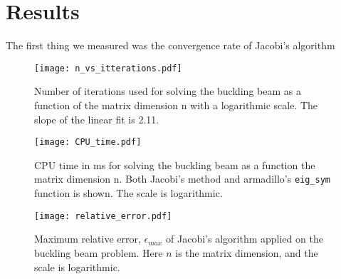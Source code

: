 \section{Results}
\label{sec:results}

The first thing we measured was the convergence rate of Jacobi's algorithm
\begin{figure}[htbp]
	\centering
	\texttt{[image: n\_vs\_itterations.pdf]}
	\caption{Number of iterations used for solving the buckling beam as a function of the matrix dimension n with a logarithmic scale. The slope of the linear fit is 2.11.}
	\label{fig:n_vs_it}
\end{figure}


\begin{figure}[htbp]
	\centering
	\texttt{[image: CPU\_time.pdf]}
	\caption{CPU time in ms for solving the buckling beam as a function the matrix dimension n. Both Jacobi's method and armadillo's \texttt{eig\_sym} function is shown. The scale is logarithmic.}
	\label{fig:CPUtime}
\end{figure}

\begin{figure}[htbp]
	\centering
	\texttt{[image: relative\_error.pdf]}
	\caption{Maximum relative error, $\epsilon_{max}$ of Jacobi's algorithm applied on the buckling beam problem.
	Here $n$ is the matrix dimension, and the scale is logarithmic.}
	\label{fig:error}
\end{figure}
